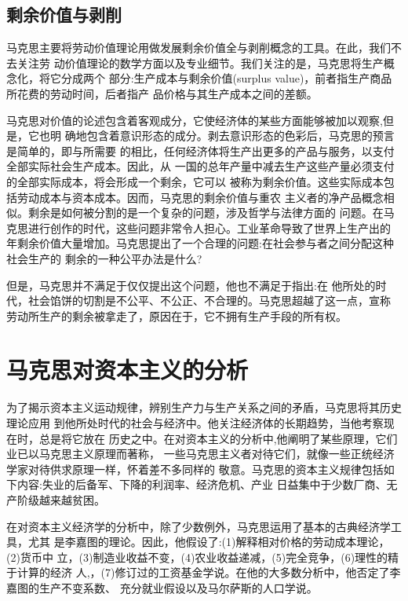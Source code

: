 \subsection{剩余价值与剥削}

马克思主要将劳动价值理论用做发展剩余价值全与剥削概念的工具。在此，我们不去关注劳
动价值理论的数学方面以及专业细节。我们关注的是，马克思将生产概念化，将它分成两个
部分:生产成本与剩余价值(surplus value)，前者指生产商品所花费的劳动时间，后者指产
品价格与其生产成本之间的差额。

马克思对价值的论述包含着客观成分，它使经济体的某些方面能够被加以观察,但是，它也明
确地包含着意识形态的成分。剥去意识形态的色彩后，马克思的预言是简单的，即与所需要
的相比，任何经济体将生产出更多的产品与服务，以支付全部实际社会生产成本。因此，从
一国的总年产量中减去生产这些产量必须支付的全部实际成本，将会形成一个剩余，它可以
被称为剩余价值。这些实际成本包括劳动成本与资本成本。因而，马克思的剩余价值与重农
主义者的净产品概念相似。剩余是如何被分割的是一个复杂的问题，涉及哲学与法律方面的
问题。在马克思进行创作的时代，这些问题非常令人担心。工业革命导致了世界上生产出的
年剩余价值大量增加。马克思提出了一个合理的问题:在社会参与者之间分配这种社会生产的
剩余的一种公平办法是什么?

但是，马克思并不满足于仅仅提出这个问题，他也不满足于指出:在
他所处的时代，社会馅饼的切割是不公平、不公正、不合理的。马克思超越了这一点，宣称
劳动所生产的剩余被拿走了，原因在于，它不拥有生产手段的所有权。

\section{马克思对资本主义的分析}

为了揭示资本主义运动规律，辨别生产力与生产关系之间的矛盾，马克思将其历史理论应用
到他所处时代的社会与经济中。他关注经济体的长期趋势，当他考察现在时，总是将它放在
历史之中。在对资本主义的分析中,他阐明了某些原理，它们业已以马克思主义原理而著称，
一些马克思主义者对待它们，就像一些正统经济学家对待供求原理一样，怀着差不多同样的
敬意。马克思的资本主义规律包括如下内容:失业的后备军、下降的利润率、经济危机、产业
日益集中于少数厂商、无产阶级越来越贫困。

在对资本主义经济学的分析中，除了少数例外，马克思运用了基本的古典经济学工具，尤其
是李嘉图的理论。因此，他假设了:(1)解释相对价格的劳动成本理论，(2)货币中
立，(3)制造业收益不变，(4)农业收益递减，(5)完全竞争，(6)理性的精于计算的经济
人,，(7)修订过的工资基金学说。在他的大多数分析中，他否定了李嘉图的生产不变系数、
充分就业假设以及马尔萨斯的人口学说。

